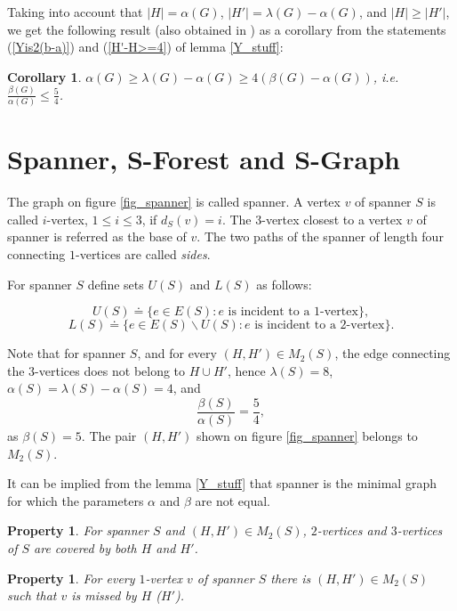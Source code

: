 \documentclass[a4paper, 12pt]{article}
\newtheorem{property}[definition]{Property}
\newtheorem{corollarysection}[definition]{Corollary}
\begin{document}
Taking into account that $|H| = \alpha(G)$, $|H'| = \lambda(G) -
\alpha(G)$, and $|H| \geq |H'|$, we get the following result (also
obtained in \cite{VAV}) as a corollary from the statements
(\ref{Yis2(b-a)}) and (\ref{H'-H>=4}) of lemma \ref{Y_stuff}:

\begin{corollarysection}\label{fivefourthinequality}
$\alpha(G) \geq \lambda(G) - \alpha(G) \geq 4(\beta(G) -
\alpha(G))$, i.e. $\frac{\beta(G)}{\alpha(G)} \leq \frac{5}{4}$.
\end{corollarysection}


\section{Spanner, S-Forest and S-Graph}

The graph on figure \ref{fig_spanner} is called spanner. A vertex
$v$ of spanner $S$ is called $i$-vertex, $1\leq i \leq 3$, if
$d_S(v)=i$. The $3$-vertex closest to a vertex $v$ of spanner is
referred as the base of $v$. The two paths of the spanner of length
four connecting $1$-vertices are called {\em sides}.

For spanner $S$ define sets $U(S)$ and $L(S)$ as follows:

$$U(S) \doteq \{e \in E(S) : \text {$e$ is incident to a
1-vertex} \},$$
$$L(S) \doteq \{e \in E(S) \backslash U(S) : \text{$e$ is incident to a 2-vertex}\}.$$

Note that for spanner $S$, and for every $(H,H')\in M_2(S)$, the
edge connecting the $3$-vertices does not belong to $H\cup H'$,
hence $\lambda(S)=8$, $\alpha(S)=\lambda(S)-\alpha(S)=4$, and
$$\frac{\beta(S)}{\alpha(S)}=\frac{5}{4},$$ as $\beta(S)=5$. The pair $(H,H')$ shown on figure \ref{fig_spanner} belongs to
$M_2(S)$.

It can be implied from the lemma \ref{Y_stuff} that spanner is the
minimal graph for which the parameters $\alpha$ and $\beta$ are not
equal.

\begin{property} \label{coveredbyboth}
For spanner $S$ and $(H,H')\in M_2(S)$, $2$-vertices and
$3$-vertices of $S$ are covered by both $H$ and $H'$.
\end{property}

\begin{property} \label{missedbyone}
For every $1$-vertex $v$ of spanner $S$ there is $(H,H')\in M_2(S)$
such that $v$ is missed by $H$ ($H'$).
\end{property}
\end{document}
